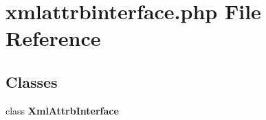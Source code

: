\section{xmlattrbinterface.php File Reference}
\label{xmlattrbinterface_8php}


\subsection*{Classes}
\begin{CompactItemize}
\item 
class {\bf Xml\-Attrb\-Interface}
\end{CompactItemize}
